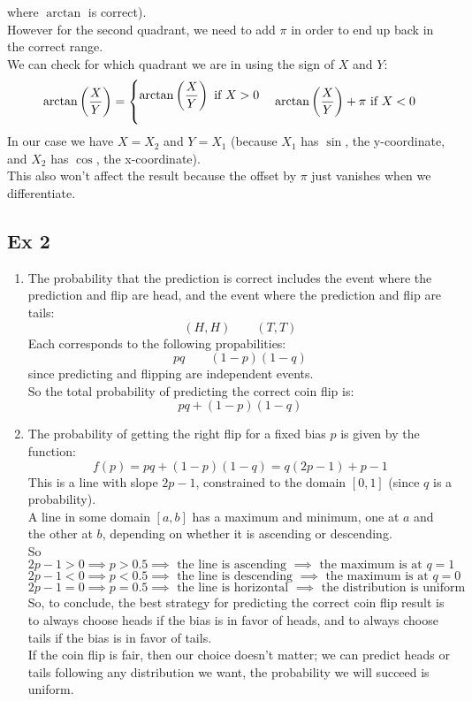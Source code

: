 \documentclass[12pt]{article}
\begin{document}
{where $\arctan$ is correct). \\
However for the second quadrant,
we need to add $\pi$ in order to end up back
in the correct range. \\
We can check for which quadrant we are in
using the sign of $X$ and $Y$:
\[ \arctan\para{\dfrac{X}{Y}}
= \piecewise{
\arctan\para{\dfrac{X}{Y}} \text{ if } X > 0
\vspace{10pt}}
{\arctan\para{\dfrac{X}{Y}} + \pi \text{ if } X < 0 } \]
In our case we have $X = X_2$
and $Y = X_1$ (because $X_1$ has $\sin$,
the y-coordinate, and $X_2$ has $\cos$,
the x-coordinate). \\
This also won't affect the result because the
offset by $\pi$ just vanishes when we differentiate. \\
}

\newpage

\subsection*{Ex 2}

\begin{enumerate}[label=\letters]
    \item 
    The probability that the prediction is correct
    includes the event where the prediction
    and flip are head, and the event where
    the prediction and flip are tails:
    \[(H, H) \qquad  (T, T) \]
    Each corresponds to the following propabilities:
    \[ pq \qquad (1-p)(1-q) \]
    since predicting and flipping are independent
    events. \\
    So the total probability of predicting
    the correct coin flip is:
    \[  pq + (1-p)(1-q) \]
    \item 
    The probability of getting the right flip
    for a fixed bias $p$ is given by the function:
    \[ f(p) = pq + (1-p)(1-q) = q(2p-1) + p - 1 \]
    This is a line with slope $2p-1$,
    constrained to the domain $[0, 1]$
    (since $q$ is a probability). \\
    A line in some domain $[a, b]$
    has a maximum and minimum, one at
    $a$ and the other at $b$, depending on
    whether it is ascending or descending. \\
    So
    \[ 2p-1 > 0 \implies p > 0.5 \implies
    \text{ the line is ascending } \implies
    \text{ the maximum is at } q = 1 \]
    \[ 2p-1 < 0 \implies p < 0.5 \implies
    \text{ the line is descending } \implies
    \text{ the maximum is at } q = 0 \]
    \[ 2p-1 = 0 \implies p = 0.5 \implies
    \text{ the line is horizontal } \implies
    \text{ the distribution is uniform } \]
    So, to conclude, the best strategy for predicting
    the correct coin flip result is to
    always choose heads if the bias is
    in favor of heads, and to always choose tails
    if the bias is in favor of tails. \\
    If the coin flip is fair,
    then our choice doesn't matter;
    we can predict heads or tails
    following any distribution we want,
    the probability we will succeed is uniform. \\
\end{enumerate}
\end{document}
